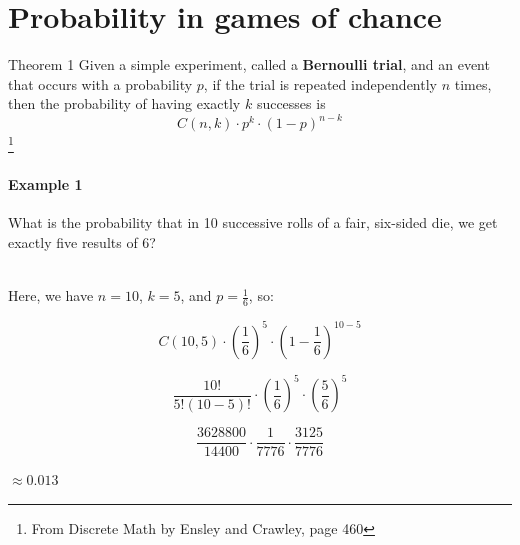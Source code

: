\documentclass[a4paper,12pt]{book}
\title{}
\author{Rachel Morris}
\date{\today}
\begin{document}
    \togglefalse{answerkey}

    \section{Probability in games of chance}

        \begin{intro}{Theorem 1}
            Given a simple experiment, called a \textbf{Bernoulli trial},
            and an event that occurs with a probability $p$, if the trial is repeated
            independently $n$ times, then the probability of having exactly
            $k$ successes is
            $$ C(n, k) \cdot p^{k} \cdot (1 - p)^{n-k} $$
            \footnote{From Discrete Math by Ensley and Crawley, page 460}

            \paragraph{Example 1}
            What is the probability that in 10 successive rolls of a fair, six-sided
            die, we get exactly five results of 6?

            ~\\
            Here, we have $n = 10$, $k = 5$, and $p = \frac{1}{6}$, so:

            $$C(10, 5) \cdot (\frac{1}{6})^{5} \cdot (1 - \frac{1}{6})^{10-5}$$

            $$\frac{10!}{5!(10-5)!} \cdot (\frac{1}{6})^{5} \cdot (\frac{5}{6})^{5} $$

            $$\frac{3628800}{14400} \cdot \frac{1}{7776} \cdot \frac{3125}{7776} $$

            \begin{center}
                $ \approx 0.013 $
            \end{center}

        \end{intro}
        
\end{document}
